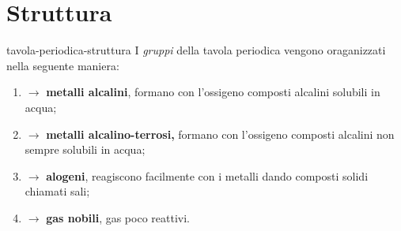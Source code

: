 \documentclass[preview]{standalone}
\begin{document}
\genpage


\section{Struttura}

\begin{snippet}{tavola-periodica-struttura}
    I \textit{gruppi} della tavola periodica vengono oraganizzati nella seguente maniera:
    \begin{enumerate}[label=\textbf{\Roman*}]
        \item $\rightarrow$ \textbf{metalli alcalini}, formano con l'ossigeno composti alcalini solubili in acqua;
        \item $\rightarrow$ \textbf{metalli alcalino-terrosi,} formano con l'ossigeno composti alcalini non
            sempre solubili in acqua;
        \item $\rightarrow$ \textbf{alogeni}, reagiscono facilmente con i metalli dando composti solidi chiamati sali;
        \item $\rightarrow$ \textbf{gas nobili}, gas poco reattivi.
    \end{enumerate}
    \vspace{.5cm}
\end{snippet}
\end{document}
